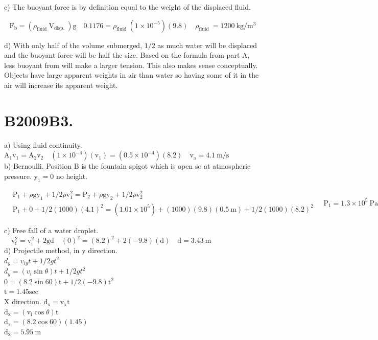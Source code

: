 \begin{enumerate}
c) The buoyant force is by definition equal to the weight of the displaced fluid.

$$
\mathrm{F}_{\mathrm{b}}=\left(\rho_{\text {fluid }} \mathrm{V}_{\text {disp. }}\right) \mathrm{g} \quad 0.1176=\rho_{\text {fluid }}\left(1 \times 10^{-5}\right)(9.8) \quad \rho_{\text {fluid }}=1200 \mathrm{~kg} / \mathrm{m}^{3}
$$

d) With only half of the volume submerged, $1 / 2$ as much water will be displaced and the buoyant force will be half the size. Based on the formula from part A, less buoyant from will make a larger tension. This also makes sense conceptually. Objects have large apparent weights in air than water so having some of it in the air will increase its apparent weight.

\section*{B2009B3.}
a) Using fluid continuity. $\mathrm{A}_{1} \mathrm{v}_{1}=\mathrm{A}_{2} \mathrm{v}_{2} \quad\left(1 \times 10^{-4}\right)\left(\mathrm{v}_{1}\right)=\left(0.5 \times 10^{-4}\right)(8.2) \quad \mathrm{v}_{\mathrm{a}}=4.1 \mathrm{~m} / \mathrm{s}$\\
b) Bernoulli. Position B is the fountain spigot which is open so at atmospheric pressure. $\mathrm{y}_{1}=0$ no height.

$$
\begin{aligned}
& \mathrm{P}_{1}+\rho \mathrm{gy}_{1}+1 / 2 \rho \mathrm{v}_{1}^{2}=\mathrm{P}_{2}+\rho \mathrm{gy}_{2}+1 / 2 \rho \mathrm{v}_{2}^{2} \\
& \mathrm{P}_{1}+0+1 / 2(1000)(4.1)^{2}=\left(1.01 \times 10^{5}\right)+(1000)(9.8)(0.5 \mathrm{~m})+1 / 2(1000)(8.2)^{2}
\end{aligned} \quad \mathrm{P}_{1}=1.3 \times 10^{5} \mathrm{~Pa}
$$

c) Free fall of a water droplet. $\quad \mathrm{v}_{\mathrm{f}}^{2}=\mathrm{v}_{\mathrm{i}}^{2}+2 \mathrm{gd} \quad(0)^{2}=(8.2)^{2}+2(-9.8)(\mathrm{d}) \quad \mathrm{d}=3.43 \mathrm{~m}$\\
d) Projectile method, in y direction.\\
$d_{y}=v_{i y} t+1 / 2 g t^{2}$\\
$d_{y}=\left(v_{i} \sin \theta\right) t+1 / 2 g t^{2}$\\
$0=(8.2 \sin 60) \mathrm{t}+1 / 2(-9.8) \mathrm{t}^{2}$\\
$\mathrm{t}=1.45 \mathrm{sec}$\\
X direction. $\mathrm{d}_{\mathrm{x}}=\mathrm{v}_{\mathrm{x}} \mathrm{t}$\\
$\mathrm{d}_{\mathrm{x}}=\left(\mathrm{v}_{\mathrm{i}} \cos \theta\right) \mathrm{t}$\\
$\mathrm{d}_{\mathrm{x}}=(8.2 \cos 60)(1.45)$\\
$\mathrm{d}_{\mathrm{x}}=5.95 \mathrm{~m}$


\end{enumerate}

